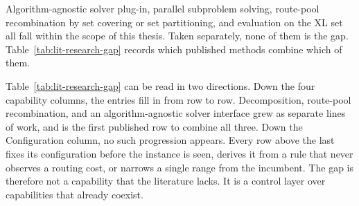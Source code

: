 Algorithm-agnostic solver plug-in, parallel subproblem solving, route-pool recombination by set covering or set partitioning, and evaluation on the XL set all fall within the scope of this thesis. Taken separately, none of them is the gap. Table~\ref{tab:lit-research-gap} records which published methods combine which of them.

Table~\ref{tab:lit-research-gap} can be read in two directions. Down the four capability columns, the entries fill in from row to row. Decomposition, route-pool recombination, and an algorithm-agnostic solver interface grew as separate lines of work, and \citet{kerscherSolvingHeterogeneousVehicle} is the first published row to combine all three. Down the Configuration column, no such progression appears. Every row above the last fixes its configuration before the instance is seen, derives it from a rule that never observes a routing cost, or narrows a single range from the incumbent. The gap is therefore not a capability that the literature lacks. It is a control layer over capabilities that already coexist.

